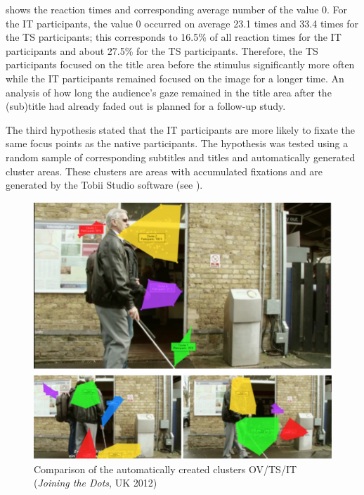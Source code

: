 \documentclass[output=paper]{langsci/langscibook}
\begin{document}
 shows the reaction times and corresponding average number of the value 0. For the IT participants, the value 0 occurred on average 23.1 times and 33.4 times for the TS participants; this corresponds to 16.5\% of all reaction times for the IT participants and about 27.5\% for the TS participants. Therefore, the TS participants focused on the title area before the stimulus significantly more often while the IT participants remained focused on the image for a longer time. An analysis of how long the audience's gaze remained in the title area after the (sub)title had already faded out is planned for a follow-up study.



The third hypothesis stated that the IT participants are more likely to fixate the same focus points as the native participants. The hypothesis was tested using a random sample of corresponding subtitles and titles and automatically generated cluster areas. These clusters are areas with accumulated fixations and are generated by the Tobii Studio software (see ).


\begin{figure} 
  \includegraphics[height=.3\textheight]{figures/Fox9.png}
  \caption{Comparison of the automatically created clusters OV/TS/IT (\textit{Joining the Dots}, UK 2012)}
  \label{fox:fig:9}
\end{figure}
\end{document}

